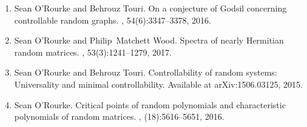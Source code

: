 \documentclass[letterpaper]{article}
\begin{document}
\begin{enumerate}
	\item Sean O'Rourke and Behrouz Touri.
	\newblock On a conjecture of {G}odsil concerning controllable random graphs.
	, 54(6):3347--3378, 2016.
	\item Sean O'Rourke and Philip~Matchett Wood.
	\newblock Spectra of nearly {H}ermitian random matrices.
	, 53(3):1241--1279, 2017.

	\item Sean O'Rourke and Behrouz Touri.
	\newblock Controllability of random systems: Universality and minimal controllability.
	\newblock Available at  arXiv:1506.03125, 2015.  
	\item Sean O'Rourke.
	\newblock Critical points of random polynomials and characteristic polynomials of random matrices.
	, (18):5616--5651, 2016.


\end{enumerate}
\end{document}
